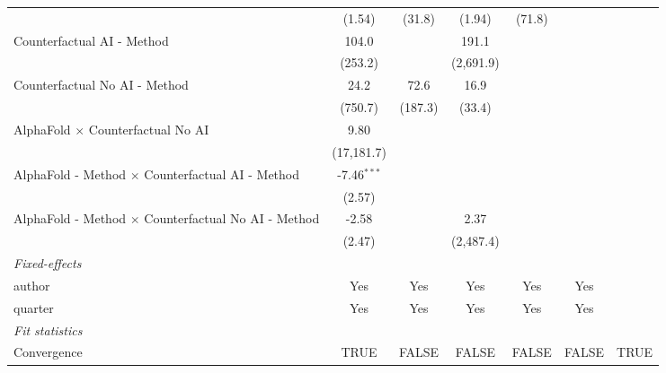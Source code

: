 \begin{tabular}{lcccccc}
                                                              & (1.54)        & (31.8)  & (1.94)    & (71.8)  &               &   \\   
   Counterfactual AI - Method                                 & 104.0         &         & 191.1     &         &               &   \\   
                                                              & (253.2)       &         & (2,691.9) &         &               &   \\   
   Counterfactual No AI - Method                              & 24.2          & 72.6    & 16.9      &         &               &   \\   
                                                              & (750.7)       & (187.3) & (33.4)    &         &               &   \\   
   AlphaFold $\times$ Counterfactual No AI                    & 9.80          &         &           &         &               &   \\   
                                                              & (17,181.7)    &         &           &         &               &   \\   
   AlphaFold - Method $\times$ Counterfactual AI - Method     & -7.46$^{***}$ &         &           &         &               &   \\   
                                                              & (2.57)        &         &           &         &               &   \\   
   AlphaFold - Method $\times$ Counterfactual No AI - Method  & -2.58         &         & 2.37      &         &               &   \\   
                                                              & (2.47)        &         & (2,487.4) &         &               &   \\   
   \midrule
   \emph{Fixed-effects}\\
   author                                                     & Yes           & Yes     & Yes       & Yes     & Yes           & \\  
   quarter                                                    & Yes           & Yes     & Yes       & Yes     & Yes           & \\  
   \midrule
   \emph{Fit statistics}\\
   Convergence                                                &TRUE           & FALSE   & FALSE     & FALSE   & FALSE         & TRUE\\  

\end{tabular}
